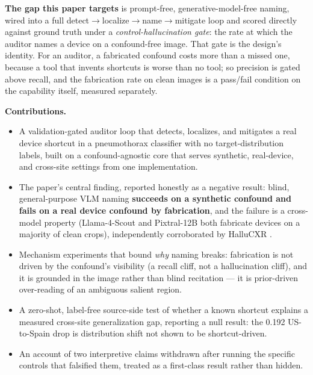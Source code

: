 \documentclass{ieeeaccess}
\newcommand{\arw}{$\rightarrow$\allowbreak}
\begin{document}
\textbf{The gap this paper targets} is prompt-free, generative-model-free naming, wired into a full detect\arw{}localize\arw{}name\arw{}mitigate loop and scored directly against ground truth under a \emph{control-hallucination gate}: the rate at which the auditor names a device on a confound-free image. That gate is the design's identity. For an auditor, a fabricated confound costs more than a missed one, because a tool that invents shortcuts is worse than no tool; so precision is gated above recall, and the fabrication rate on clean images is a pass/fail condition on the capability itself, measured separately.

\textbf{Contributions.}
\begin{itemize}
\item A validation-gated auditor loop that detects, localizes, and mitigates a real device shortcut in a pneumothorax classifier with no target-distribution labels, built on a confound-agnostic core that serves synthetic, real-device, and cross-site settings from one implementation.
\item The paper's central finding, reported honestly as a negative result: blind, general-purpose VLM naming \textbf{succeeds on a synthetic confound and fails on a real device confound by fabrication}, and the failure is a cross-model property (Llama-4-Scout and Pixtral-12B both fabricate devices on a majority of clean crops), independently corroborated by HalluCXR \cite{hallucxr}.
\item Mechanism experiments that bound \emph{why} naming breaks: fabrication is not driven by the confound's visibility (a recall cliff, not a hallucination cliff), and it is grounded in the image rather than blind recitation --- it is prior-driven over-reading of an ambiguous salient region.
\item A zero-shot, label-free source-side test of whether a known shortcut explains a measured cross-site generalization gap, reporting a null result: the 0.192 US-to-Spain drop is distribution shift not shown to be shortcut-driven.
\item An account of two interpretive claims withdrawn after running the specific controls that falsified them, treated as a first-class result rather than hidden.
\end{itemize}

\end{document}
